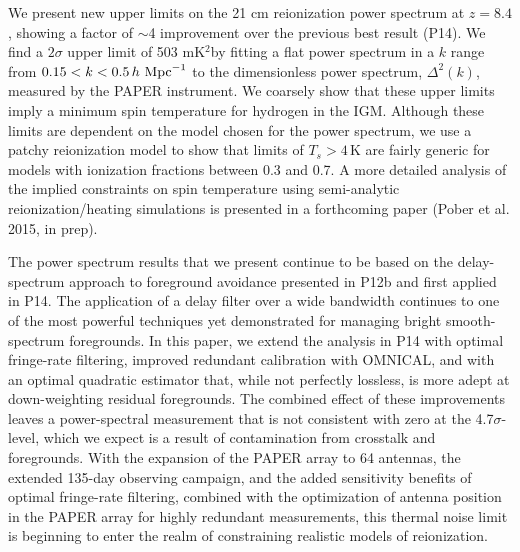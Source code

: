 \documentclass[twocolumn,numberedappendix]{emulateapj} \shorttitle{New Limits on the 21 cm Power Spectrum at $z=8.4$}
\newcommand{\hMpci}{h\ {\rm Mpc}^{-1}}
\newcommand{\mKsqlimit}{503 mK$^2$}
\newcommand{\pobercitep}{(Pober et al. 2015, in prep)}
\begin{document}
We present new upper limits on the 21 cm reionization power spectrum at $z=8.4$,
showing a factor of $\sim$4 improvement over the previous best result (P14).
We find a $2\sigma$ upper limit of \mKsqlimit by fitting a
flat power spectrum in a $k$ range from $0.15<k<0.5\,\hMpci$ to the
dimensionless power spectrum, $\Delta^{2}(k)$, measured by the PAPER instrument. 
We coarsely show that these upper limits imply a minimum spin
temperature for hydrogen in the IGM.  Although these limits are dependent on
the model chosen for the power spectrum, we use a patchy reionization model
to show that limits of $T_s>4\,\textrm{K}$ are fairly generic for models with
ionization fractions between 0.3 and 0.7.
A more detailed analysis of the implied constraints on spin temperature using semi-analytic reionization/heating simulations is presented in a forthcoming paper \pobercitep.

The power spectrum results that we present continue to be based on
the delay-spectrum approach to foreground avoidance presented in 
P12b and first applied in P14.  The application of a delay filter over
a wide bandwidth continues to one of the most powerful techniques yet
demonstrated for managing bright smooth-spectrum foregrounds.  In this
paper, we extend the analysis in P14 with optimal fringe-rate filtering,
improved redundant calibration with OMNICAL, and with an optimal quadratic
estimator that, while not perfectly lossless, is more adept at down-weighting residual foregrounds.
The combined effect of these improvements leaves a power-spectral measurement that
is not consistent with zero at the 4.7$\sigma$-level, which we expect is a result of
contamination from crosstalk and foregrounds.
With the expansion of the PAPER array to 64 antennas, the extended 135-day
observing campaign,
and the added sensitivity benefits of optimal fringe-rate filtering, combined with
the optimization of antenna position in the PAPER array for highly redundant
measurements, this thermal
noise limit is beginning to enter the realm of constraining realistic models of reionization.
\end{document}
